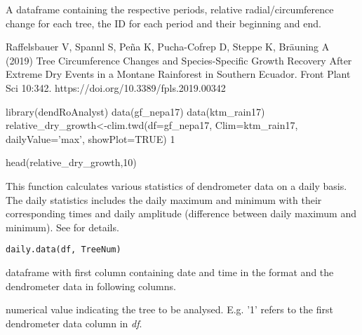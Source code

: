 \documentclass[a4paper]{book}
\begin{document}
%
\begin{Value}
A dataframe containing the respective periods, relative radial/circumference change for each tree, the ID for each period and their beginning and end.
\end{Value}
%
\begin{References}\relax
Raffelsbauer V, Spannl S, Peña K, Pucha-Cofrep D, Steppe K, Bräuning A (2019) Tree Circumference Changes and Species-Specific Growth Recovery After Extreme Dry Events in a Montane Rainforest in Southern Ecuador. Front Plant Sci 10:342. https://doi.org/10.3389/fpls.2019.00342
\end{References}
%
\begin{Examples}
\begin{ExampleCode}
library(dendRoAnalyst)
data(gf_nepa17)
data(ktm_rain17)
relative_dry_growth<-clim.twd(df=gf_nepa17, Clim=ktm_rain17, dailyValue='max', showPlot=TRUE)
1

head(relative_dry_growth,10)

\end{ExampleCode}
\end{Examples}
%
\begin{Description}\relax
This function calculates various statistics of dendrometer data on a daily basis. The daily statistics includes the daily maximum and minimum with their corresponding times and daily amplitude (difference between daily maximum and minimum). See  for details.
\end{Description}
%
\begin{Usage}
\begin{verbatim}
daily.data(df, TreeNum)
\end{verbatim}
\end{Usage}
%
\begin{Arguments}
\begin{ldescription}
\item[\code{df}] dataframe with first column containing date and time in the format  and the dendrometer data in following columns.

\item[\code{TreeNum}] numerical value indicating the tree to be analysed. E.g. '1' refers to the first dendrometer data column in \emph{df}.
\end{ldescription}
\end{Arguments}
\end{document}
